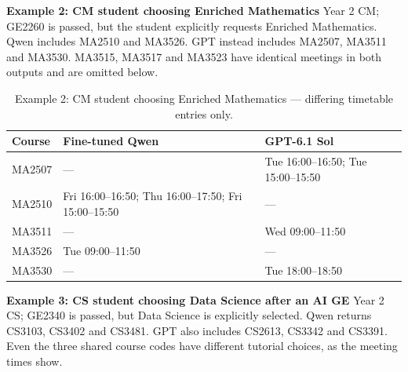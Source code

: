 \documentclass{article}
\begin{document}
\textbf{Example 2: CM student choosing Enriched Mathematics} Year 2 CM; GE2260 is passed, but the student explicitly requests Enriched Mathematics. Qwen includes MA2510 and MA3526. GPT instead includes MA2507, MA3511 and MA3530. MA3515, MA3517 and MA3523 have identical meetings in both outputs and are omitted below.

\begin{table}[H]
\centering\small
\caption{Example 2: CM student choosing Enriched Mathematics --- differing timetable entries only.}
\begin{tabular}{p{.6in}p{2.2in}p{2.2in}}
\toprule
Course & Fine-tuned Qwen & GPT-6.1 Sol\\
\midrule
{\raggedright MA2507\par} & {\raggedright ---\par} & {\raggedright Tue 16:00--16:50; Tue 15:00--15:50\par}\\
{\raggedright MA2510\par} & {\raggedright Fri 16:00--16:50; Thu 16:00--17:50; Fri 15:00--15:50\par} & {\raggedright ---\par}\\
{\raggedright MA3511\par} & {\raggedright ---\par} & {\raggedright Wed 09:00--11:50\par}\\
{\raggedright MA3526\par} & {\raggedright Tue 09:00--11:50\par} & {\raggedright ---\par}\\
{\raggedright MA3530\par} & {\raggedright ---\par} & {\raggedright Tue 18:00--18:50\par}\\
\bottomrule
\end{tabular}
\label{tab:comparison04-2}
\end{table}

\textbf{Example 3: CS student choosing Data Science after an AI GE} Year 2 CS; GE2340 is passed, but Data Science is explicitly selected. Qwen returns CS3103, CS3402 and CS3481. GPT also includes CS2613, CS3342 and CS3391. Even the three shared course codes have different tutorial choices, as the meeting times show.
\end{document}
